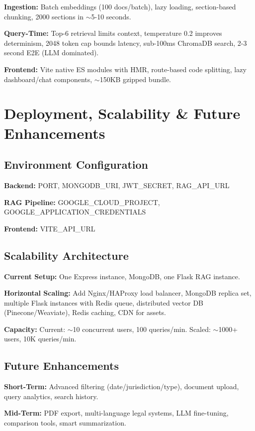 \documentclass[12pt,a4paper]{article}
\begin{document}
\textbf{Ingestion:} Batch embeddings (100 docs/batch), lazy loading, section-based chunking, 2000 sections in $\sim$5-10 seconds.

\textbf{Query-Time:} Top-6 retrieval limits context, temperature 0.2 improves determinism, 2048 token cap bounds latency, sub-100ms ChromaDB search, 2-3 second E2E (LLM dominated).

\textbf{Frontend:} Vite native ES modules with HMR, route-based code splitting, lazy dashboard/chat components, $\sim$150KB gzipped bundle.

\section{Deployment, Scalability \& Future Enhancements}

\subsection{Environment Configuration}

\textbf{Backend:} PORT, MONGODB\_URI, JWT\_SECRET, RAG\_API\_URL

\textbf{RAG Pipeline:} GOOGLE\_CLOUD\_PROJECT, GOOGLE\_APPLICATION\_CREDENTIALS

\textbf{Frontend:} VITE\_API\_URL

\subsection{Scalability Architecture}

\textbf{Current Setup:} One Express instance, MongoDB, one Flask RAG instance.

\textbf{Horizontal Scaling:} Add Nginx/HAProxy load balancer, MongoDB replica set, multiple Flask instances with Redis queue, distributed vector DB (Pinecone/Weaviate), Redis caching, CDN for assets.

\textbf{Capacity:} Current: $\sim$10 concurrent users, 100 queries/min. Scaled: $\sim$1000+ users, 10K queries/min.

\subsection{Future Enhancements}

\textbf{Short-Term:} Advanced filtering (date/jurisdiction/type), document upload, query analytics, search history.

\textbf{Mid-Term:} PDF export, multi-language legal systems, LLM fine-tuning, comparison tools, smart summarization.
\end{document}

